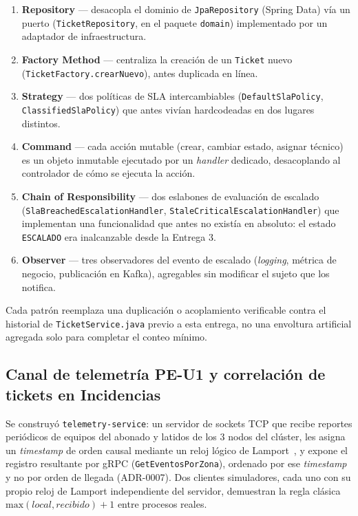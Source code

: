 \begin{enumerate}[nosep]
  \item \textbf{Repository} --- desacopla el dominio de \texttt{JpaRepository} (Spring Data) vía
        un puerto (\texttt{TicketRepository}, en el paquete \texttt{domain}) implementado por un
        adaptador de infraestructura.
  \item \textbf{Factory Method} --- centraliza la creación de un \texttt{Ticket} nuevo
        (\texttt{TicketFactory.crearNuevo}), antes duplicada en línea.
  \item \textbf{Strategy} --- dos políticas de SLA intercambiables (\texttt{DefaultSlaPolicy},
        \texttt{ClassifiedSlaPolicy}) que antes vivían hardcodeadas en dos lugares distintos.
  \item \textbf{Command} --- cada acción mutable (crear, cambiar estado, asignar técnico) es un
        objeto inmutable ejecutado por un \emph{handler} dedicado, desacoplando al controlador de
        cómo se ejecuta la acción.
  \item \textbf{Chain of Responsibility} --- dos eslabones de evaluación de escalado
        (\texttt{SlaBreachedEscalationHandler}, \texttt{StaleCriticalEscalationHandler}) que
        implementan una funcionalidad que antes no existía en absoluto: el estado
        \texttt{ESCALADO} era inalcanzable desde la Entrega 3.
  \item \textbf{Observer} --- tres observadores del evento de escalado (\emph{logging}, métrica de
        negocio, publicación en Kafka), agregables sin modificar el sujeto que los notifica.
\end{enumerate}

Cada patrón reemplaza una duplicación o acoplamiento verificable contra el historial de
\texttt{TicketService.java} previo a esta entrega, no una envoltura artificial agregada solo para
completar el conteo mínimo.

\subsection{Canal de telemetría PE-U1 y correlación de tickets en Incidencias}
\label{sec:pe-u1-correl}

Se construyó \texttt{telemetry-service}: un servidor de sockets TCP que recibe reportes
periódicos de equipos del abonado y latidos de los 3 nodos del clúster, les asigna un
\emph{timestamp} de orden causal mediante un reloj lógico de Lamport~\cite{lamport1978time}, y
expone el registro resultante por gRPC (\texttt{GetEventosPorZona}), ordenado por ese
\emph{timestamp} y no por orden de llegada (ADR-0007). Dos clientes simuladores, cada uno con su
propio reloj de Lamport independiente del servidor, demuestran la regla clásica
$\text{max}(local, recibido) + 1$ entre procesos reales.

